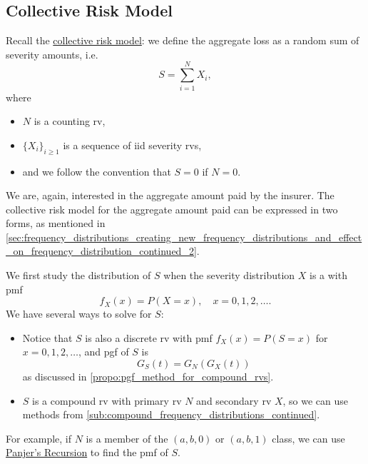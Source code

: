 \documentclass[notoc,notitlepage]{tufte-book}
\begin{document}

\subsection{Collective Risk Model}%
\label{sub:collective_risk_model}

Recall the \hyperref[defn:collective_risk_model]{collective risk model}: we define the aggregate loss as a random sum of severity amounts, i.e.
\begin{equation*}
  S = \sum_{i=1}^{N} X_i,
\end{equation*}
where
\begin{itemize}
  \item $N$ is a counting rv,
  \item $\{ X_i \}_{i \geq 1}$ is a sequence of iid severity rvs,
  \item and we follow the convention that $S = 0$ if $N = 0$.
\end{itemize}

We are, again, interested in the aggregate amount paid by the insurer. The collective risk model for the aggregate amount paid can be expressed in two forms, as mentioned in \cref{sec:frequency_distributions_creating_new_frequency_distributions_and_effect_on_frequency_distribution_continued_2}.

We first study the distribution of $S$ when the severity distribution $X$ is a  with pmf
\begin{equation*}
  f_X(x) = P(X = x), \quad x = 0, 1, 2, \ldots.
\end{equation*}
We have several ways to solve for $S$:
\begin{itemize}
  \item Notice that $S$ is also a discrete rv with pmf $f_X(x) = P(S = x)$ for $x = 0, 1, 2, \ldots$, and pgf of $S$ is
    \begin{equation*}
      G_S(t) = G_N( G_X(t) )
    \end{equation*}
    as discussed in \cref{propo:pgf_method_for_compound_rvs}.
  \item $S$ is a compound rv with primary rv $N$ and secondary rv $X$, so we can use methods from \cref{sub:compound_frequency_distributions_continued}.
\end{itemize}

For example, if $N$ is a member of the $(a, b, 0)$ or $(a, b, 1)$ class, we can use \hyperref[thm:panjer_s_recursion_for_a_b_0_class]{Panjer's Recursion} to find the pmf of $S$.
\end{document}
